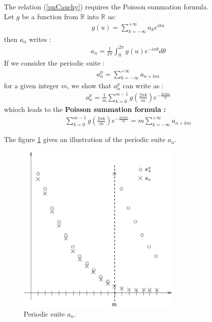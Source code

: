 The relation (\ref{pnCauchy}) requires the Poisson summation formula.\\

Let  $g$ be a function from $\mathbb{R}$ into $\mathbb{R}$ as:
\begin{eqnarray}\label{g2u}
g(u) = \sum_{k=-\infty}^{+\infty} a_k e^{iku}
\end{eqnarray}
then $a_n$ writes :
\begin{eqnarray}\label{an}
a_n = \frac{1}{2\pi}\int_{0}^{2\pi} g(u)e^{-in\theta} d\theta
\end{eqnarray}
If we consider the periodic suite :
\begin{eqnarray}\label{anp}
a_n^p =  \sum_{k=-\infty}^{+\infty} a_{n+km}
\end{eqnarray}
for a given integer $m$, we show that $a_n^p$ can write as : 
\begin{eqnarray}\label{anp2}
a_n^p =  \displaystyle \frac{1}{m} \sum_{k=0}^{m-1} g\left(\frac{2\pi k}{m}\right)e^{-\frac{2i\pi kn}{m}}
\end{eqnarray}
whioch leads to the  {\bf Poisson summation formula :}
\begin{eqnarray}\label{forSomPoisson}
\sum_{k=0}^{m-1} g\left(\frac{2\pi k}{m}\right)e^{-\frac{2i\pi kn}{m}} = m \sum_{k=-\infty}^{+\infty}a_{n+km}
\end{eqnarray}

The figure \ref{FigAnp} gives an illustration of the periodic suite $a_n$.

\begin{figure}[hbtp]
     \begin{center}
      \includegraphics[width=8cm]{figAnp.pdf} 
      \caption{Periodic suite $a_n$.}
      \label{FigAnp}
    \end{center}
 \end{figure}





